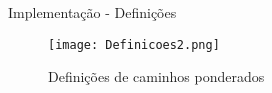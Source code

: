 \begin{frame}{Implementação - Definições}
    \begin{figure}[htbp]
        \centering
        \texttt{[image: Definicoes2.png]}
        \caption{Definições de caminhos ponderados}
    \end{figure}
\end{frame}
